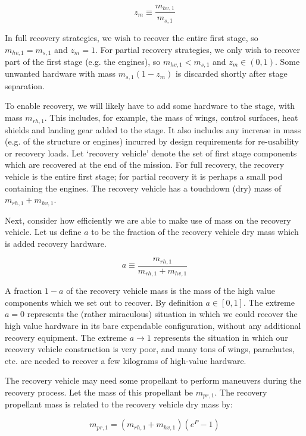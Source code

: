 \documentclass[conf]{new-aiaa}
\begin{document}
\begin{equation}
z_m \equiv \frac{m_{hv,1}}{m_{s,1}}
\end{equation}

In full recovery strategies, we wish to recover the entire first stage, so $m_{hv,1} = m_{s,1}$ and $z_m=1$. For partial recovery strategies, we only wish to recover part of the first stage (e.g. the engines), so $m_{hv,1} < m_{s,1}$ and $z_m \in (0, 1)$. Some unwanted hardware with mass $m_{s,1}(1 - z_m)$ is discarded shortly after stage separation.

To enable recovery, we will likely have to add some hardware to the stage, with mass $m_{rh,1}$. This includes, for example, the mass of wings, control surfaces, heat shields and landing gear added to the stage. It also includes any increase in mass (e.g. of the structure or engines) incurred by design requirements for re-usability or recovery loads. Let `recovery vehicle' denote the set of first stage components which are recovered at the end of the mission. For full recovery, the recovery vehicle is the entire first stage; for partial recovery it is perhaps a small pod containing the engines. The recovery vehicle has a touchdown (dry) mass of $m_{rh,1} + m_{hv,1}$.

Next, consider how efficiently we are able to make use of mass on the recovery vehicle. Let us define $a$ to be the fraction of the recovery vehicle dry mass which is added recovery hardware.

\begin{equation}
a \equiv \frac{m_{rh,1}}{m_{rh,1} + m_{hv,1}}
\end{equation}

A fraction $1-a$ of the recovery vehicle mass is the mass of the high value components which we set out to recover. By definition $a \in [0, 1]$. The extreme $a=0$ represents the (rather miraculous) situation in which we could recover the high value hardware in its bare expendable configuration, without any additional recovery equipment. The extreme $a \rightarrow 1$ represents the situation in which our recovery vehicle construction is very poor, and many tons of wings, parachutes, etc. are needed to recover a few kilograms of high-value hardware.

The recovery vehicle may need some propellant to perform maneuvers during the recovery process. Let the mass of this propellant be $m_{pr,1}$. The recovery propellant mass is related to the recovery vehicle dry mass by:

\begin{equation}
m_{pr,1} = (m_{rh,1} + m_{hv,1}) \left( e^P - 1 \right)
\end{equation}
\end{document}
